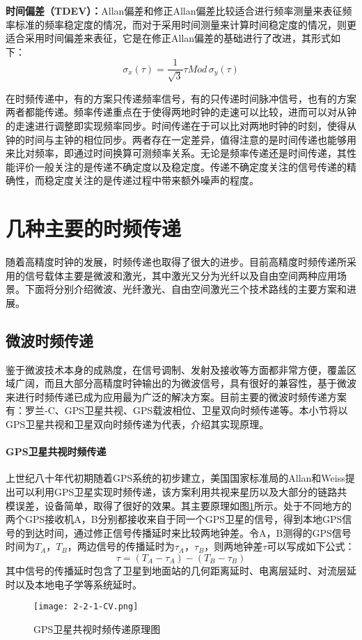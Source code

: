 \textbf{时间偏差（TDEV）：}Allan偏差和修正Allan偏差比较适合进行频率测量来表征频率标准的频率稳定度的情况，而对于采用时间测量来计算时间稳定度的情况，则更适合采用时间偏差来表征，它是在修正Allan偏差的基础进行了改进，其形式如下：
\begin{equation}
\sigma_{x}(\tau)=\dfrac{1}{\sqrt{3}}\tau Mod\,\sigma_{y}(\tau)
\end{equation}

在时频传递中，有的方案只传递频率信号，有的只传递时间脉冲信号，也有的方案两者都能传递。频率传递重点在于使得两地时钟的走速可以比较，进而可以对从钟的走速进行调整即实现频率同步。时间传递在于可以比对两地时钟的时刻，使得从钟的时间与主钟的相位同步。两者存在一定差异，值得注意的是时间传递也能够用来比对频率，即通过时间换算可测频率关系。无论是频率传递还是时间传递，其性能评价一般关注的是传递不确定度以及稳定度。传递不确定度关注的信号传递的精确性，而稳定度关注的是传递过程中带来额外噪声的程度。

\section{几种主要的时频传递}
随着高精度时钟的发展，时频传递也取得了很大的进步。目前高精度时频传递所采用的信号载体主要是微波和激光，其中激光又分为光纤以及自由空间两种应用场景。下面将分别介绍微波、光纤激光、自由空间激光三个技术路线的主要方案和进展。

\subsection{微波时频传递}
鉴于微波技术本身的成熟度，在信号调制、发射及接收等方面都非常方便，覆盖区域广阔，而且大部分高精度时钟输出的为微波信号，具有很好的兼容性，基于微波来进行时频传递已成为应用最为广泛的解决方案。目前主要的微波时频传递方案有：罗兰-C、GPS卫星共视、GPS载波相位、卫星双向时频传递等。本小节将以GPS卫星共视和卫星双向时频传递为代表，介绍其实现原理。

\paragraph*{GPS卫星共视时频传递}
上世纪八十年代初期随着GPS系统的初步建立，美国国家标准局的Allan和Weiss提出可以利用GPS卫星实现时频传递，该方案利用共视来星历以及大部分的链路共模误差，设备简单，取得了很好的效果。其主要原理如图\ref{2-2-1-CV}所示。处于不同地方的两个GPS接收机A，B分别都接收来自于同一个GPS卫星的信号，得到本地GPS信号的到达时间，通过修正信号传播延时来比较两地钟差。令A，B测得的GPS信号时间为$T_{A}$，$ T_{B}$，两边信号的传播延时为$\tau_{A}$，$\tau_{B}$，则两地钟差$\tau$可以写成如下公式：
\begin{equation}
\tau=(T_{A}-\tau_{A})-(T_{B}-\tau_{B})
\end{equation}
其中信号的传播延时包含了卫星到地面站的几何距离延时、电离层延时、对流层延时以及本地电子学等系统延时。
\begin{figure}[htbp]
\centering
\texttt{[image: 2-2-1-CV.png]}
\caption{GPS卫星共视时频传递原理图}
\label{2-2-1-CV}
\end{figure}

